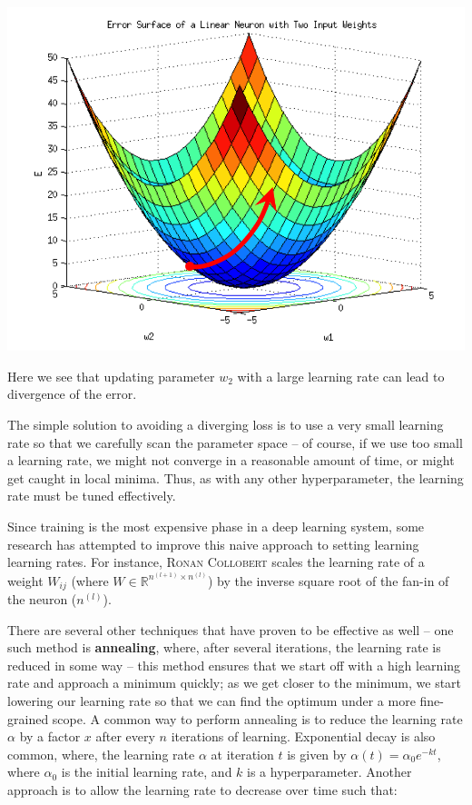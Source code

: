 \documentclass{tufte-handout}
\begin{document}
\begin{marginfigure}%
  \includegraphics[width=\linewidth]{Error_Surf}
  \caption{Here we see that updating parameter $w_2$ with a large learning rate can lead to divergence of the error.}
  \label{fig:ErrorSurf}
\end{marginfigure}

The simple solution to avoiding a diverging loss is to use a very small learning rate so that we carefully scan the parameter space -- of course, if we use too small a learning rate, we might not converge in a reasonable amount of time, or might get caught in local minima.  Thus, as with any other hyperparameter, the learning rate must be tuned effectively.



Since training is the most expensive phase in a deep learning system, some research has attempted to improve this naive approach to setting learning learning rates. For instance, \textsc{Ronan Collobert} scales the learning rate of a weight $W_{ij}$  (where $W \in \mathbb{R}^{n^{(l+1)}\times n^{(l)}}$) by the inverse square root of the fan-in of the neuron ($n^{(l)}$). 

There are several other techniques that have proven to be effective as well -- one such method is \textbf{annealing}, where, after several iterations, the learning rate is reduced in some way -- this method ensures that we start off with a high learning rate and approach a minimum quickly; as we get closer to the minimum, we start lowering our learning rate so that we can find the optimum under a more fine-grained scope. A common way to perform annealing is to reduce the learning rate $\alpha$ by a factor $x$ after every $n$ iterations of learning. Exponential decay is also common, where, the learning rate $\alpha$ at iteration $t$ is given by $\alpha(t) = \alpha_0e^{-kt}$, where $\alpha_0$ is the initial learning rate, and $k$ is a hyperparameter. Another approach is to allow the learning rate to decrease over time such that:
\end{document}
